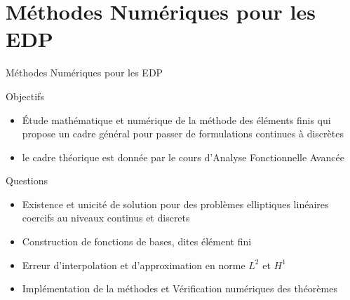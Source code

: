 \documentclass{beamer}
\begin{document}
\section{Méthodes Numériques pour les EDP}
\begin{frame}{Méthodes Numériques pour les EDP}
  \begin{block}{Objectifs}
    \begin{itemize}
    \item Étude mathématique et numérique de la méthode des éléments
      finis qui propose un cadre général pour passer de formulations
      continues à discrètes
    \item le cadre théorique est donnée par le cours d'Analyse
      Fonctionnelle Avancée
    \end{itemize}
  \end{block}
  \begin{block}{Questions}
    \begin{itemize}
    \item Existence et unicité de solution pour des problèmes
      elliptiques linéaires coercifs au niveaux continus et discrets
    \item Construction de fonctions de bases, dites élément fini
    \item Erreur d'interpolation et d'approximation en norme $L^2$ et $H^1$
    \item Implémentation de la méthodes et Vérification numériques des théorèmes
    \end{itemize}
  \end{block}
\end{frame}
\end{document}
